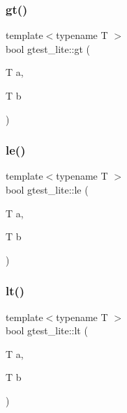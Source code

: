 \mbox{\label{namespacegtest__lite_a2075d101da98f80f569b0737c5185718}} 
\subsubsection{\texorpdfstring{gt()}{gt()}}
{\footnotesize\ttfamily template$<$typename T $>$ \\
bool gtest\+\_\+lite\+::gt (\begin{DoxyParamCaption}\item[{T}]{a,  }\item[{T}]{b }\end{DoxyParamCaption})}

\mbox{\label{namespacegtest__lite_a92068d494867b61abeef5942eefac3a3}} 
\subsubsection{\texorpdfstring{le()}{le()}}
{\footnotesize\ttfamily template$<$typename T $>$ \\
bool gtest\+\_\+lite\+::le (\begin{DoxyParamCaption}\item[{T}]{a,  }\item[{T}]{b }\end{DoxyParamCaption})}

\mbox{\label{namespacegtest__lite_acfefb55c5d3713c79b659bbd18d9423c}} 
\subsubsection{\texorpdfstring{lt()}{lt()}}
{\footnotesize\ttfamily template$<$typename T $>$ \\
bool gtest\+\_\+lite\+::lt (\begin{DoxyParamCaption}\item[{T}]{a,  }\item[{T}]{b }\end{DoxyParamCaption})}

\mbox{\label{namespacegtest__lite_a9a1485affebbed604f7cac69f70072dc}} 
